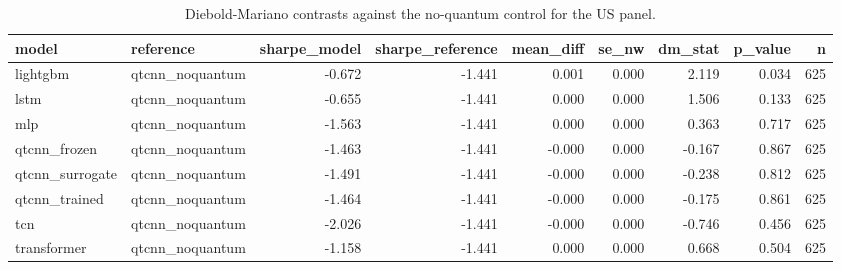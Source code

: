 \begin{table}[t]
\caption{Diebold-Mariano contrasts against the no-quantum control for the US panel.}
\label{tab:ablation-us}
\begin{tabular}{llrrrrrrr}
\toprule
model & reference & sharpe\_model & sharpe\_reference & mean\_diff & se\_nw & dm\_stat & p\_value & n \\
\midrule
lightgbm & qtcnn\_noquantum & -0.672 & -1.441 & 0.001 & 0.000 & 2.119 & 0.034 & 625 \\
lstm & qtcnn\_noquantum & -0.655 & -1.441 & 0.000 & 0.000 & 1.506 & 0.133 & 625 \\
mlp & qtcnn\_noquantum & -1.563 & -1.441 & 0.000 & 0.000 & 0.363 & 0.717 & 625 \\
qtcnn\_frozen & qtcnn\_noquantum & -1.463 & -1.441 & -0.000 & 0.000 & -0.167 & 0.867 & 625 \\
qtcnn\_surrogate & qtcnn\_noquantum & -1.491 & -1.441 & -0.000 & 0.000 & -0.238 & 0.812 & 625 \\
qtcnn\_trained & qtcnn\_noquantum & -1.464 & -1.441 & -0.000 & 0.000 & -0.175 & 0.861 & 625 \\
tcn & qtcnn\_noquantum & -2.026 & -1.441 & -0.000 & 0.000 & -0.746 & 0.456 & 625 \\
transformer & qtcnn\_noquantum & -1.158 & -1.441 & 0.000 & 0.000 & 0.668 & 0.504 & 625 \\
\bottomrule
\end{tabular}
\end{table}
